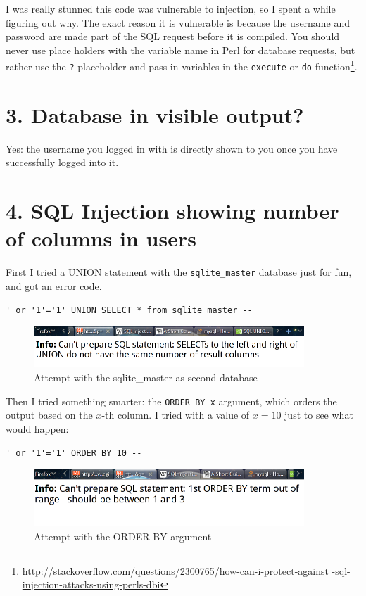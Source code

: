 \documentclass[12pt,letterpaper]{article}
\begin{document}
I was really stunned this code was vulnerable to injection, so I spent a while
figuring out why. The exact reason it is vulnerable is because the
username and password are made part of the SQL request before it is compiled.
You should never use place holders with the variable name in Perl for database
requests, but rather use the \verb!?! placeholder and pass in variables
in the \verb!execute! or \verb!do! function\footnote{
\url{http://stackoverflow.com/questions/2300765/how-can-i-protect-against
-sql-injection-attacks-using-perls-dbi}}.

\section*{3. Database in visible output?}
Yes: the username you logged in with is directly shown to you once
you have successfully logged into it.

\section*{4. SQL Injection showing number of columns in users}
First I tried a UNION statement with the \verb!sqlite_master! database
just for fun, and got an error code.

\begin{verbatim}
' or '1'='1' UNION SELECT * from sqlite_master --
\end{verbatim}

\begin{figure}[H]
	\centering
	\includegraphics[width=4in]{attempt2.png}
	\caption{Attempt with the sqlite\_master as second database}
\end{figure}

Then I tried something smarter: the \verb!ORDER BY x! argument, which
orders the output based on the $x$-th column. I tried with a value of $x=10$
just to see what would happen:

\begin{verbatim}
' or '1'='1' ORDER BY 10 --
\end{verbatim}

\begin{figure}[H]
	\centering
	\includegraphics[width=4in]{attempt3.png}
	\caption{Attempt with the ORDER BY argument}
\end{figure}
\end{document}
